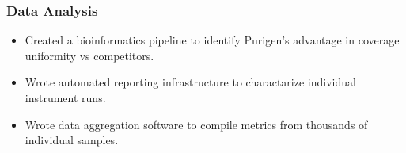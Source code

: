 \documentclass{res}
\begin{document}
\begin{resume}
    \subsubsection{Data Analysis}
      \begin{itemize}
        \item Created a bioinformatics pipeline to identify Purigen's advantage in coverage uniformity vs competitors.
        \item Wrote automated reporting infrastructure to charactarize individual instrument runs.
        \item Wrote data aggregation software to compile metrics from thousands of individual samples.
      \end{itemize}




\end{resume}
\end{document}
